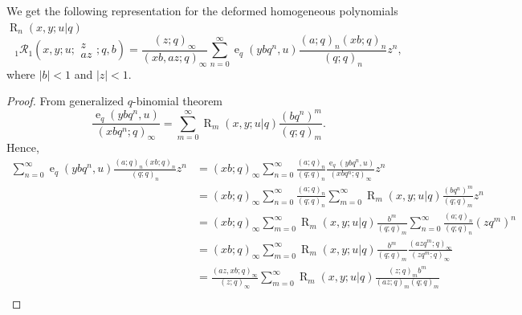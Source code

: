 \documentclass{cimart}
\newcommand{\rbhs}{\mathcal{R}}
\DeclareMathOperator{\ope}{e}
\DeclareMathOperator{\opR}{R}
\begin{document}
\begin{theorem}\label{theo_repre_DHP}
We get the following representation for the deformed homogeneous polynomials $\opR_{n}(x,y;u|q)$
    \begin{equation}
        {}_{1}\rbhs_{1}\left(x,y;u;
        \begin{array}{c}
             z \\
             az
        \end{array};
        q,b
        \right)=\frac{(z;q)_{\infty}}{(xb,az;q)_{\infty}}\sum_{n=0}^{\infty}\ope_{q}(ybq^n,u)\frac{(a;q)_{n}(xb;q)_{n}}{(q;q)_{n}}z^n,
    \end{equation}
where $\vert b\vert<1$ and $\vert z\vert<1$.
\end{theorem}
\begin{proof}
From generalized $q$-binomial theorem
\begin{equation}
    \frac{\ope_{q}(ybq^n,u)}{(xbq^n;q)_{\infty}}=\sum_{m=0}^{\infty}\opR_{m}(x,y;u|q)\frac{(bq^{n})^m}{(q;q)_{m}}.
\end{equation}
Hence,
\begin{align*}
    \sum_{n=0}^{\infty}\ope_{q}(ybq^n,u)\frac{(a;q)_{n}(xb;q)_{n}}{(q;q)_{n}}z^n&=(xb;q)_{\infty}\sum_{n=0}^{\infty}\frac{(a;q)_{n}}{(q;q)_{n}}\frac{\ope_{q}(ybq^n,u)}{(xbq^n;q)_{\infty}}z^n\\
    &=(xb;q)_{\infty}\sum_{n=0}^{\infty}\frac{(a;q)_{n}}{(q;q)_{n}}\sum_{m=0}^{\infty}\opR_{m}(x,y;u|q)\frac{(bq^{n})^m}{(q;q)_{m}}z^n\\
    &=(xb;q)_{\infty}\sum_{m=0}^{\infty}\opR_{m}(x,y;u|q)\frac{b^m}{(q;q)_{m}}\sum_{n=0}^{\infty}\frac{(a;q)_{n}}{(q;q)_{n}}(zq^m)^n\\
    &=(xb;q)_{\infty}\sum_{m=0}^{\infty}\opR_{m}(x,y;u|q)\frac{b^m}{(q;q)_{m}}\frac{(azq^m;q)_{\infty}}{(zq^m;q)_{\infty}}\\
    &=\frac{(az,xb;q)_{\infty}}{(z;q)_{\infty}}\sum_{m=0}^{\infty}\opR_{m}(x,y;u|q)\frac{(z;q)_{m}b^m}{(az;q)_{m}(q;q)_{m}}\\
\end{align*}
\end{proof}
\end{document}
